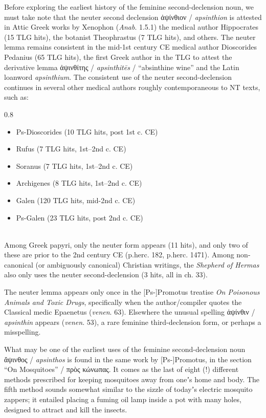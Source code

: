 Before exploring the earliest history of the feminine second-declension noun, %
we must take note that the neuter second declension ἀψίνθιον / \textit{apsinthion} %
is attested in Attic Greek works by Xenophon (\textit{Anab}. 1.5.1) %
the medical author Hippocrates (15 TLG hits), %
the botanist Theophrastus (7 TLG hits), and others. %
The neuter lemma remains consistent in the mid-1st century CE medical author Dioscorides Pedanius (65 TLG hits), %
the first Greek author in the TLG to attest the derivative lemma ἀψινθίτης / \textit{apsinthitēs} / %
“absinthine wine” and the Latin loanword \textit{apsinthium}. %
The consistent use of the neuter second-declension continues in several other medical authors roughly contemporaneous to NT texts, %
such as: %

\begin{spacing}{0.8}
\begin{small}
\begin{itemize}
\item Ps-Dioscorides (10 TLG hits, post 1st c. CE) %
\item Rufus (7 TLG hits, 1st--2nd c. CE) %
\item Soranus (7 TLG hits, 1st--2nd c. CE) %
\item Archigenes (8 TLG hits, 1st--2nd c. CE) %
\item Galen (120 TLG hits, mid-2nd c. CE) %
\item Ps-Galen (23 TLG hits, post 2nd c. CE) %
\end{itemize}
\end{small}
\end{spacing} \\[1.5mm] %

Among Greek papyri, only the neuter form appears (11 hits), %
and only two of these are prior to the 2nd century CE (p.herc. 182, p.herc. 1471). %
Among non-canonical (or ambiguously canonical) Christian writings, %
the \textit{Shepherd of Hermas} also only uses the neuter second-declension (3 hits, all in ch. 33).\clearpage %

The neuter lemma appears only once in the [Ps-]Promotus treatise \textit{On Poisonous Animals and Toxic Drugs}, %
specifically when the author/compiler quotes the Classical medic Epaenetus (\textit{venen}. 63). %
Elsewhere the unusual spelling ἀψίνθιν / \textit{apsinthin} appears (\textit{venen}. 53), %
a rare feminine third-declension form, or perhaps a misspelling. %

What may be one of the earliest uses of the feminine second-declension noun ἄψινθος / %
\textit{apsinthos} %
is found in the same work by [Ps-]Promotus, %
in the section “On Mosquitoes” / πρὸς κώνωπας. %
It comes as the last of eight (!) different methods prescribed %
for keeping mosquitoes away from oneʼs home and body. %
The fifth method sounds somewhat similar to the sizzle of todayʼs electric mosquito zappers; %
it entailed placing a fuming oil lamp inside a pot with many holes, designed to attract and kill the insects. %

